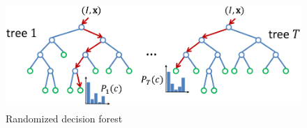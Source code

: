 \begin{figure}
	[h] \centering 
	\includegraphics[height=4cm]{figures/content/ni-decision.png} \caption{Randomized decision forest} \label{fg:ni:decision} 
\end{figure}
